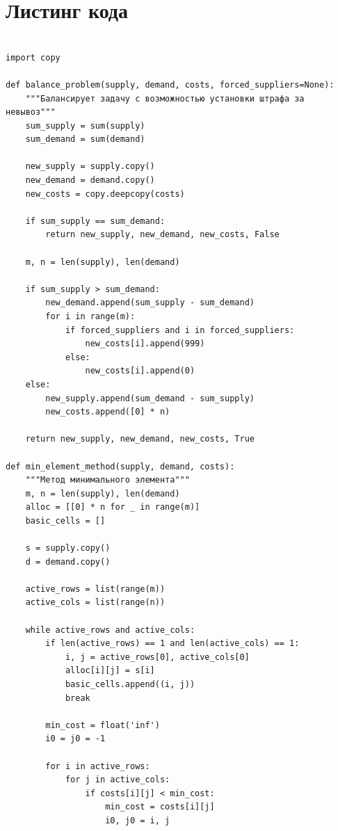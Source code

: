 \documentclass[oneside,a4paper,14pt]{extarticle}
\begin{document}
\newpage
\section*{Листинг кода}

\begin{verbatim}

import copy

def balance_problem(supply, demand, costs, forced_suppliers=None):
    """Балансирует задачу с возможностью установки штрафа за невывоз"""
    sum_supply = sum(supply)
    sum_demand = sum(demand)

    new_supply = supply.copy()
    new_demand = demand.copy()
    new_costs = copy.deepcopy(costs)

    if sum_supply == sum_demand:
        return new_supply, new_demand, new_costs, False

    m, n = len(supply), len(demand)

    if sum_supply > sum_demand:
        new_demand.append(sum_supply - sum_demand)
        for i in range(m):
            if forced_suppliers and i in forced_suppliers:
                new_costs[i].append(999)
            else:
                new_costs[i].append(0)
    else:
        new_supply.append(sum_demand - sum_supply)
        new_costs.append([0] * n)

    return new_supply, new_demand, new_costs, True

def min_element_method(supply, demand, costs):
    """Метод минимального элемента"""
    m, n = len(supply), len(demand)
    alloc = [[0] * n for _ in range(m)]
    basic_cells = []

    s = supply.copy()
    d = demand.copy()

    active_rows = list(range(m))
    active_cols = list(range(n))

    while active_rows and active_cols:
        if len(active_rows) == 1 and len(active_cols) == 1:
            i, j = active_rows[0], active_cols[0]
            alloc[i][j] = s[i]
            basic_cells.append((i, j))
            break

        min_cost = float('inf')
        i0 = j0 = -1

        for i in active_rows:
            for j in active_cols:
                if costs[i][j] < min_cost:
                    min_cost = costs[i][j]
                    i0, j0 = i, j


\end{verbatim}
\end{document}
